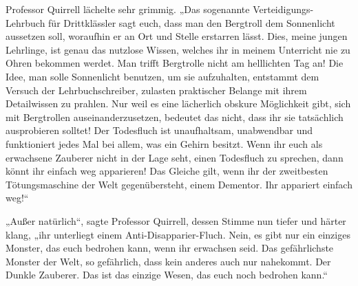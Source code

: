 Professor Quirrell lächelte sehr grimmig.
„Das sogenannte Verteidigungs-Lehrbuch für Drittklässler sagt euch, dass man den Bergtroll dem Sonnenlicht aussetzen soll, woraufhin er an Ort und Stelle erstarren lässt. Dies, meine jungen Lehrlinge, ist genau das nutzlose Wissen, welches ihr in meinem Unterricht nie zu Ohren bekommen werdet. Man trifft Bergtrolle nicht am helllichten Tag an! Die Idee, man solle Sonnenlicht benutzen, um sie aufzuhalten, entstammt dem Versuch der Lehrbuchschreiber, zulasten praktischer Belange mit ihrem Detailwissen zu prahlen. Nur weil es eine lächerlich obskure Möglichkeit gibt, sich mit Bergtrollen auseinanderzusetzen, bedeutet das nicht, dass ihr sie tatsächlich ausprobieren solltet! Der Todesfluch ist unaufhaltsam, unabwendbar und funktioniert jedes Mal bei allem, was ein Gehirn besitzt. Wenn ihr euch als erwachsene Zauberer nicht in der Lage seht, einen Todesfluch zu sprechen, dann könnt ihr einfach weg apparieren! Das Gleiche gilt, wenn ihr der zweitbesten Tötungsmaschine der Welt gegenübersteht, einem Dementor. Ihr appariert einfach weg!“

„Außer natürlich“, sagte Professor Quirrell, dessen Stimme nun tiefer und härter klang, „ihr unterliegt einem Anti-Disapparier-Fluch. Nein, es gibt nur ein einziges Monster, das euch bedrohen kann, wenn ihr erwachsen seid. Das gefährlichste Monster der Welt, so gefährlich, dass kein anderes auch nur nahekommt. Der Dunkle Zauberer. Das ist das einzige Wesen, das euch noch bedrohen kann.“

